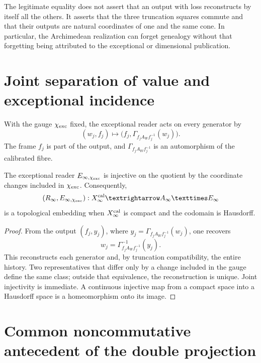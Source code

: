 The legitimate equality does not assert that an output with loss reconstructs by itself
all the others. It asserts that the three truncation squares commute and
that their outputs are natural coordinates of one and the same cone. In particular,
the Archimedean realization can forget genealogy without that forgetting being
attributed to the exceptional or dimensional publication.

\section{Joint separation of value and exceptional incidence}
\label{sec:cpe-separacion-conjunta}

With the gauge \(\chi_{\rm exc}\) fixed, the exceptional reader acts on every
generator by
\begin{equation}
 (w_j,f_j)\longmapsto
 \bigl(f_j,\Gamma_{f_jA_Wf_j^{-1}}(w_j)\bigr).
 \label{eq:cpe-lector-excepcional-generador}
\end{equation}
The frame \(f_j\) is part of the output, and
\(\Gamma_{f_jA_Wf_j^{-1}}\) is an automorphism of the calibrated fibre.

\begin{theorem}
\label{thm:cpe-separacion-calibrada}
The exceptional reader
\(\mathfrak E_{\infty,\chi_{\rm exc}}\) is injective on the quotient by
the coordinate changes included in \(\chi_{\rm exc}\). Consequently,
\[
 (\mathfrak R_\infty,\mathfrak E_{\infty,\chi_{\rm exc}})
 :X_\infty^{\rm cal}\longrightarrow
 A_\infty\times E_\infty
\]
is a topological embedding when \(X_\infty^{\rm cal}\) is compact and the
codomain is Hausdorff.
\end{theorem}

\begin{proof}
From the output \((f_j,y_j)\), where
\(y_j=\Gamma_{f_jA_Wf_j^{-1}}(w_j)\), one recovers
\[
 w_j=\Gamma_{f_jA_Wf_j^{-1}}^{-1}(y_j).
\]
This reconstructs each generator and, by truncation compatibility, the entire history. Two representatives that differ only by a change included in the gauge define the same class; outside that equivalence, the reconstruction is unique. Joint injectivity is immediate. A continuous injective map from a compact space into a Hausdorff space is a homeomorphism onto its image.
\end{proof}

\section{Common noncommutative antecedent of the double projection}
\label{sec:cpe-antecedente-ucp}

